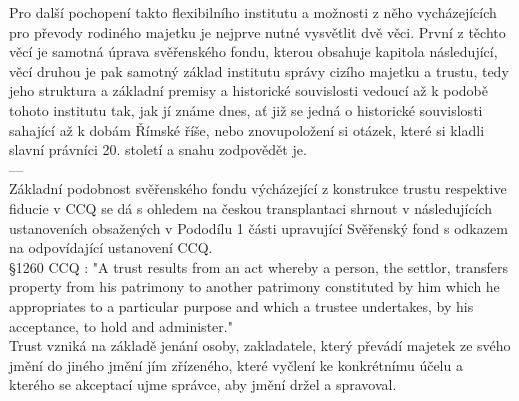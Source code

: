\documentclass{article}
\begin{document}
 Pro další pochopení takto flexibilního institutu a možnosti z něho vycházejících pro převody rodiného majetku je nejprve nutné vysvětlit dvě věci. První z těchto věcí je samotná úprava svěřenského fondu, kterou obsahuje kapitola následující, věcí druhou je pak samotný základ institutu správy cizího majetku a trustu, tedy jeho struktura a základní premisy a historické souvislosti vedoucí až k podobě tohoto institutu tak, jak jí známe dnes, ať již se jedná o historické souvislosti sahající až k dobám Římské říše, nebo znovupoložení si otázek, které si kladli slavní právníci 20. století a snahu zodpovědět je.\\
 ---\\





Základní podobnost svěřenského fondu výcházející z konstrukce trustu respektive fiducie v CCQ se dá s ohledem na českou transplantaci shrnout v následujících ustanoveních obsažených v Pododílu 1 části upravující Svěřenský fond s odkazem na odpovídající ustanovení CCQ.\\


§1260 CCQ : "A trust results from an act whereby a person, the settlor, transfers property from his patrimony to another patrimony constituted by him which he appropriates to a particular purpose and which a trustee undertakes, by his acceptance, to hold and administer."\\

Trust vzniká na základě jenání osoby, zakladatele, který převádí majetek ze svého jmění do jiného jmění jím zřízeného, které vyčlení ke konkrétnímu účelu a kterého se akceptací ujme správce, aby jmění držel a spravoval.\\
\end{document}

